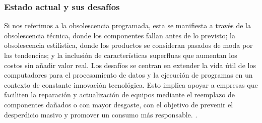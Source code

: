 \documentclass[10pt,journal,compsoc]{IEEEtran}
\begin{document}
\subsubsection{Estado actual y sus desafíos}
Si nos referimos a la obsolescencia programada, esta se manifiesta a través de la obsolescencia
técnica, donde los componentes fallan antes de lo previsto; la obsolescencia estilística, donde los
productos se consideran pasados de moda por las tendencias; y la inclusión de características
superfluas que aumentan los costos sin añadir valor real\cite{maycroft2009consumption}.
Los desafíos se centran en extender la vida útil de los computadores para el procesamiento de datos y la ejecución de programas en un contexto de constante innovación tecnológica. Esto implica apoyar a empresas que faciliten la reparación y actualización de equipos mediante el reemplazo de componentes dañados o con mayor desgaste,  con el objetivo de prevenir el desperdicio masivo y promover un consumo más responsable. \cite{lebel2012wasting}.
\end{document}
